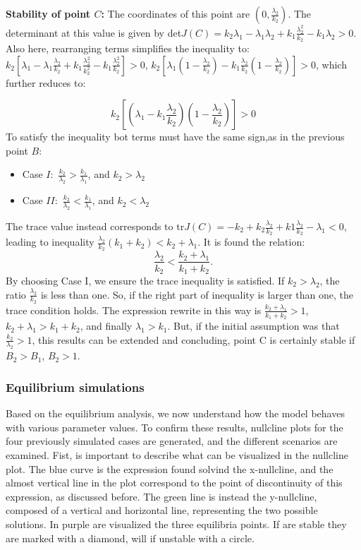 \textbf{Stability of point $C$:} The coordinates of this point are $(0, \frac{\lambda_2}{k_2})$. The determinant at this value is given by det$J(C) = k_2 \lambda_1 - \lambda_1 \lambda_2 + k_1 \frac{\lambda_2^2}{k_2} - k_1 \lambda_2 > 0 $. Also here, rearranging terms simplifies the inequality to: $k_2 [\lambda_1 -\lambda_1 \frac{\lambda_2}{k_2} + k_1 \frac{\lambda_2^2}{k_2^2} - k_1 \frac{\lambda_2^2}{k_2}] >0$, $ k_2 [\lambda_1 ( 1 -  \frac{\lambda_2}{k_2}) - k_1 \frac{\lambda_2}{k_2} (1 - \frac{\lambda_2}{k_2})] >0$, which further reduces to:

\[
 k_2 [(\lambda_1 - k_1 \frac{\lambda_2}{k_2})(1 - \frac{\lambda_2}{k_2})] >0
\]
To satisfy the inequality bot terms must have the same sign,as in the previous point $B$:
\begin{itemize}
	\item Case $I:$ $\frac{k_2}{\lambda_2} > \frac{k_1}{\lambda_1} $, and $k_2 > \lambda_2$
 	\item Case $II:$ $\frac{k_2}{\lambda_2} < \frac{k_1}{\lambda_1} $, and $k_2 < \lambda_2$
\end{itemize}
The trace value instead corresponds to tr$J(C) = - k_2 + k_2 \frac{\lambda_2}{k_2} + k1 \frac{\lambda_2}{k_2} - \lambda_1 < 0$, leading to inequality 
$ \frac{\lambda_2}{k_2} (k_1 + k_2) < k_2 + \lambda_1 $. It is found the relation:
\[ \frac{\lambda_2}{k_2} < \frac{k_2 +\lambda_1}{k_1 + k_2}.\]
By choosing Case I, we ensure the trace inequality is satisfied. If $k_2 > \lambda_2$, the ratio $\frac{\lambda_2}{k_2}$ is less than one. So, if the right part of inequality is larger than one, the trace condition holds. The expression rewrite in this way is $\frac{k_2 +\lambda_1}{k_1 + k_2} > 1$, $k_2 +\lambda_1 > k_1 + k_2 $, and finally $\lambda_1 > k_1$. But, if the initial assumption was that $ \frac{k_2 }{\lambda_2} > 1$, this results can be extended and concluding, point C is certainly stable if $B_2> B_1$, $B_2 > 1$.  
 
\subsubsection{Equilibrium simulations}

Based on the equilibrium analysis, we now understand how the model behaves with various parameter values. To confirm these results, nullcline plots for the four previously simulated cases are generated, and the different scenarios are examined. Fist, is important to describe what can be visualized in the nullcline plot. The blue curve is the expression found solvind the x-nullcline, and the almost vertical line in the plot correspond to the point of discontinuity of this expression, as discussed before. The green line is instead the y-nullcline, composed of a vertical and horizontal line, representing the two possible solutions. In purple are visualized the three equilibria points. If are stable they are marked with a diamond, will if unstable with a circle.  
\\

